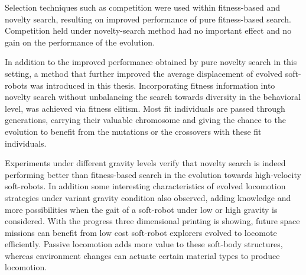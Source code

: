Selection techniques such as competition were used within fitness-based and novelty search, resulting on improved performance of pure fitness-based search. Competition held under novelty-search method had no important effect and no gain on the performance of the evolution. 

In addition to the improved performance obtained by pure novelty search in this setting, a method that further improved the average displacement of evolved soft-robots was introduced in this thesis. Incorporating fitness information into novelty search without unbalancing the search towards diversity in the behavioral level, was achieved via fitness elitism. Most fit individuals are passed through generations, carrying their valuable chromosome and giving the chance to the evolution to benefit from the mutations or the crossovers with these fit individuals.

Experiments under different gravity levels verify that novelty search is indeed performing better than fitness-based search in the evolution towards high-velocity soft-robots. In addition some interesting characteristics of evolved locomotion strategies under variant gravity condition also observed, adding knowledge and more possibilities when the gait of a soft-robot under low or high gravity is considered. With the progress three dimensional printing is showing, future space missions can benefit from low cost soft-robot explorers evolved to locomote efficiently. Passive locomotion adds more value to these soft-body structures, whereas environment changes can actuate certain material types to produce locomotion.
